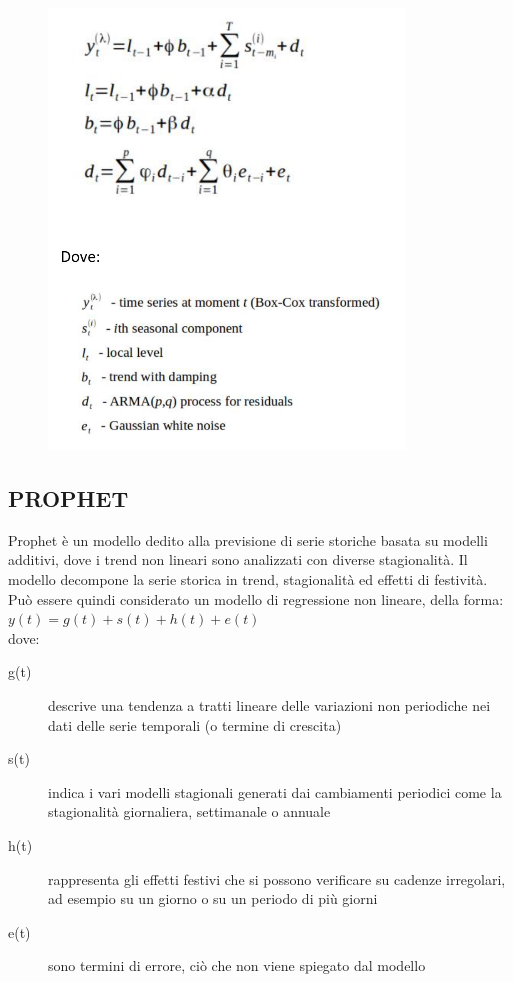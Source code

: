 \documentclass[12pt, a4paper, twocolumn]{article} %
\begin{document}
\begin{figure}[H]
  \caption{\protect\cite{tbats}}
  \begin{center}
    \includegraphics{tbats2.png}
  \end{center}
\end{figure}

\subsection{PROPHET}
Prophet è un modello dedito alla previsione di serie storiche basata su modelli additivi, dove i trend non lineari sono analizzati con diverse stagionalità. Il modello decompone la serie storica in trend, stagionalità ed effetti di festività.\\
Può essere quindi considerato un modello di regressione non lineare, della forma:\\
$y(t) = g(t) + s(t) + h(t) + e(t)$\\
dove:
\begin{description}
	\item[g(t)] descrive una tendenza a tratti lineare delle variazioni non periodiche nei dati delle serie temporali (o termine di crescita)
	\item[s(t)] indica i vari modelli stagionali generati dai cambiamenti periodici come la stagionalità giornaliera, settimanale o annuale
	\item[h(t)] rappresenta gli effetti festivi che si possono verificare su cadenze irregolari, ad esempio su un giorno o su un periodo di più giorni
	\item[e(t)] sono termini di errore, ciò che non viene spiegato dal modello
\end{description}
\cite{mathprophet}\cite{fbprophet}
\end{document}
